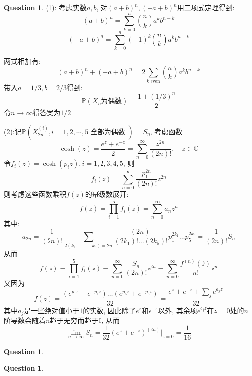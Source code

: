 \documentclass[12pt,a4paper]{ctexart}
\newcommand{\bb}[1]{\mathbb{#1}}
\theoremstyle{definition}
\newtheorem{ques}[defn]{Question}
\begin{document}
\newpage
\begin{ques}
    (1): 考虑实数$a,b$, 对$(a+b)^n,(-a+b)^n$用二项式定理得到:
    \begin{equation*}
        (a+b)^n=\sum_{k=0}^n\binom{n}{k}a^kb^{n-k}
    \end{equation*}
    \begin{equation*}
        (-a+b)^n=\sum_{k=0}^n(-1)^k\binom{n}{k}a^kb^{n-k}
    \end{equation*}

    两式相加有:
    \begin{equation*}
        (a+b)^n+(-a+b)^n=2\sum_{k\text{ even}}\binom{n}{k}a^kb^{n-k}
    \end{equation*}
    带入$a=1/3,b=2/3$得到:
    \begin{equation*}
        \mathbb{P}(X_n\text{为偶数})=\frac{1+(1/3)^n}{2}
    \end{equation*}
    令$n\to \infty$得答案为$1/2$

    (2):记$\bb{P}\left(X_{2 n}^{(i)}, i=1,2, \cdots, 5 \text { 全部为偶数 }\right)=S_n$,
    考虑函数
    \begin{equation*}
        \cosh(z)=\frac{e^z+e^{-z}}{2}=\sum_{n=0}^\infty \frac{z^{2n}}{(2n)!}, \quad z\in\bb{C}
    \end{equation*}
    令$f_i(z)=\cosh(p_iz),i=1,2,3,4,5$, 则
    \begin{equation*}
        f_i(z)=\sum_{n=0}^\infty \frac{p_1^{2n}}{(2n)!}z^{2n}
    \end{equation*}
    则考虑这些函数乘积$f(z)$的幂级数展开:
    \begin{equation*}
        f(z)=\prod_{i=1}^5 f_i(z)=\sum_{n=0}^\infty a_n z^n
    \end{equation*}
    其中:
    \begin{equation*}
        a_{2n}=\frac{1}{(2n)!}\sum_{2(k_1+\dots+k_5)=2n} \frac{(2n)!}{(2k_1)!\dots(2k_5)!}p_1^{2k_1}\dots p_5^{2k_5}=\frac{1}{(2n)!}S_n
    \end{equation*}
    从而
    \begin{equation*}
        f(z)=\prod_{i=1}^5 f_i(z)=\sum_{n=0}^\infty \frac{S_n}{(2n)!}z^{2n}=\sum_{n=0}^\infty \frac{f^{(n)}(0)}{n!}z^n
    \end{equation*}
    又因为
    \begin{equation*}
        f(z)=\frac{(e^{p_1z}+e^{-p_1z})\dots (e^{p_5z}+e^{-p_5z})}{32}=\frac{e^z+e^{-z}+\sum_j e^{a_jz}}{32}
    \end{equation*}
    其中$a_j$是一些绝对值小于$1$的实数, 因此除了$e^z$和$e^{-z}$以外, 其余项$e^{a_jz}$在$z=0$处的$n$阶导数会随着$n$趋于无穷而趋于$0$, 从而
    \begin{equation*}
        \lim_{n\to \infty }S_n=\frac{1}{32}(e^z+e^{-z})^{(2n)}|_{z=0}=\frac{1}{16}
    \end{equation*}












\end{ques}
\newpage
\begin{ques}


\end{ques}
\newpage
\begin{ques}


\end{ques}
\newpage
\end{document}
